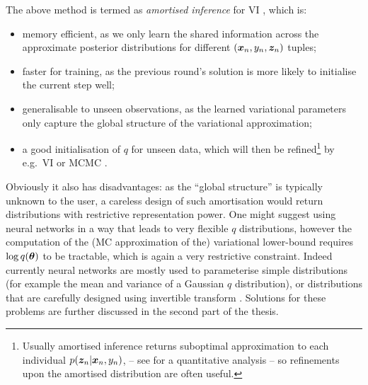 The above method is termed as \emph{amortised inference} for VI \citep{salimans:reparam2013, kingma:vae2014, rezende:vae2014}, which is:
\begin{itemize}
\item memory efficient, as we only learn the shared information across the approximate posterior distributions for different $(\bm{x}_n, y_n, \bm{z}_n)$ tuples;
\item faster for training, as the previous round's solution is more likely to initialise the current step well; 
\item generalisable to unseen observations, as the learned variational parameters only capture the global structure of the variational approximation;
\item a good initialisation of $q$ for unseen data, which will then be refined\footnote{Usually amortised inference returns suboptimal approximation to each individual $p(\bm{z}_n | \bm{x}_n, y_n)$, -- see \citet{cremer:suboptimal2018} for a quantitative analysis -- so refinements upon the amortised distribution are often useful.} by e.g.~VI \citep{marino:vi2018, kim:semi2018} or MCMC \citep{stuhlmuller:inverse2013, hoffman:vae_mcmc2017}.
\end{itemize}
Obviously it also has disadvantages: as the ``global structure'' is typically unknown to the user, a careless design of such amortisation would return distributions with restrictive representation power. One might suggest using neural networks in a way that leads to very flexible $q$ distributions, however the computation of the (MC approximation of the) variational lower-bound requires $\log q(\bm{\theta})$ to be tractable, which is again a very restrictive constraint. Indeed currently neural networks are mostly used to parameterise simple distributions (for example the mean and variance of a Gaussian $q$ distribution), or distributions that are carefully designed using invertible transform \citep{rezende:flow2015, kingma:iaf2016}. Solutions for these problems are further discussed in the second part of the thesis.

